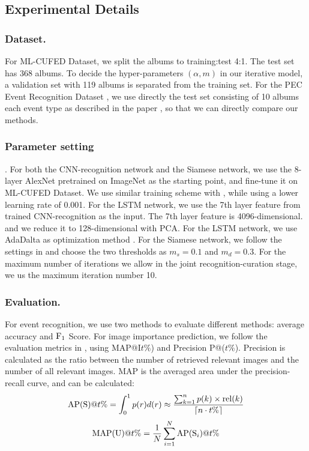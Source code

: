 \documentclass[runningheads]{llncs}
\begin{document}
\subsection{Experimental Details}
\subsubsection{Dataset.} For ML-CUFED Dataset, we split the albums to training:test 4:1. The test set has 368 albums. To decide the hyper-parameters $(\alpha, m)$ in our iterative model, a validation set with 119 albums is separated from the training set.  For the PEC Event Recognition Dataset \cite{HMM}, we use directly the test set consisting of 10 albums each event type as described in the paper \cite{HMM}, so that we can directly compare our methods.

\subsubsection{Parameter setting}. For both the CNN-recognition network and the Siamese network, we use the 8-layer AlexNet \cite{imagenet} pretrained on ImageNet as the starting point, and fine-tune it on ML-CUFED Dataset. We use similar training scheme with \cite{caffe}, while using a lower learning rate of 0.001. For the LSTM network, we use the 7th layer feature from trained CNN-recognition as the input. The 7th layer feature is 4096-dimensional. and we reduce it to 128-dimensional with PCA. For the LSTM network, we use AdaDalta as optimization method \cite{adadelta} \cite{theano1} \cite{theano2}. For the Siamese network, we follow the settings in \cite{CVPR} and choose the two thresholds as $m_{s} = 0.1$ and $m_{d}=0.3$. For the maximum number of iterations we allow in the joint recognition-curation stage, we us the maximum iteration number 10.

\subsubsection{Evaluation.} For event recognition, we use two methods to evaluate different methods: average accuracy and $\textup{F}_{1}$ Score. For image importance prediction, we follow the evaluation metrics in \cite{CVPR}, using MAP@I$t\%$) and Precision P@($t\%$).  Precision is calculated as the ratio between the number of retrieved relevant images and the number of all relevant images. MAP is the averaged area under the precision-recall curve, and can be calculated:
\begin{equation}
\textup{AP(S)}@t\%=\int_{0}^{1}p(r)d(r)\approx \frac{\sum_{k=1}^{n}p(k)\times \textup{rel}(k)}{\left \lceil n\cdot t\% \right \rceil}
\end{equation}
\begin{equation}
\textup{MAP(U)}@t\% = \frac{1}{N}\sum_{i=1}^{N}\textup{AP}(\textup{S}_{i})@t\%
\end{equation}
\end{document}
